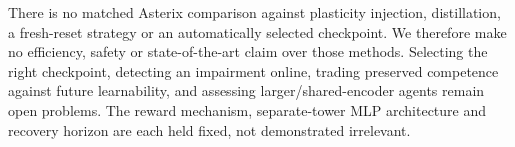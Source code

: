 There is no matched Asterix comparison against plasticity injection, distillation, a fresh-reset strategy or an automatically selected checkpoint. We therefore make no efficiency, safety or state-of-the-art claim over those methods. Selecting the right checkpoint, detecting an impairment online, trading preserved competence against future learnability, and assessing larger/shared-encoder agents remain open problems. The reward mechanism, separate-tower MLP architecture and recovery horizon are each held fixed, not demonstrated irrelevant.
